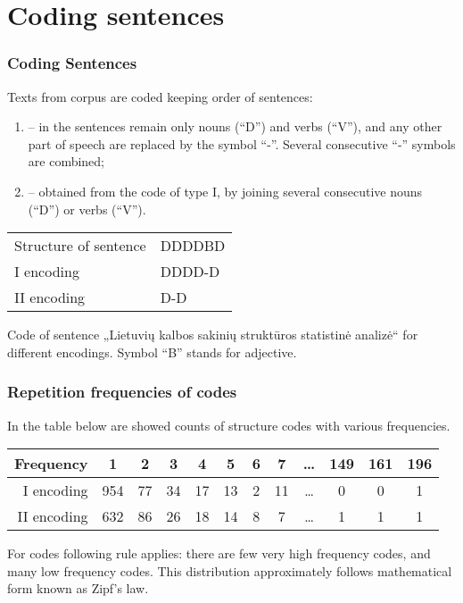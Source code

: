 \documentclass{beamer}
\begin{document}
\section{Coding sentences}
%
\begin{frame}
%
\frametitle{Coding Sentences}
Texts from corpus are coded keeping order of sentences:
\begin{enumerate}[I]
\item -- in the sentences remain only nouns (``D'') and verbs (``V''), and any 
other part of speech are replaced by the symbol ``-''. Several consecutive ``-'' 
symbols are combined;
\item --  obtained from the code of type I, by joining several consecutive nouns 
  (``D'') or verbs (``V'').
\end{enumerate}
%
\begin{table}[h!]
\centering
\begin{tabular}{ll}
\toprule
Structure of sentence & DDDDBD  \\
I encoding            & DDDD-D  \\ 
II encoding           & D-D     \\ 
\bottomrule
\end{tabular}
\end{table}
%
Code of sentence „Lietuvių kalbos sakinių struktūros statistinė analizė“ for 
different encodings. Symbol ``B'' stands for adjective.
%
 \end{frame}
 
 

\begin{frame}
\frametitle{Repetition frequencies of codes}
%
In the table below are showed counts of structure codes with various frequencies.
%
\begin{table}[h!]
\centering
\begin{tabular}{r|ccccccccccc}
\toprule
Frequency   & 1   & 2  & 3  & 4  & 5  & 6 & 7  & \dots & 149 & 161 & 196 \\ 
\midrule
I encoding  & 954 & 77 & 34 & 17 & 13 & 2 & 11 & \dots & 0 & 0 & 1 \\ 
II encoding & 632 & 86 & 26 & 18 & 14 & 8 & 7  & \dots & 1 & 1 & 1\\ 
\bottomrule
\end{tabular}
\end{table}
%
\bigskip
%
For codes following rule applies: there are few very high frequency codes, 
and many low frequency codes. This distribution approximately follows 
mathematical form known as \alert{Zipf's law}.
%
\end{frame}
\end{document}

